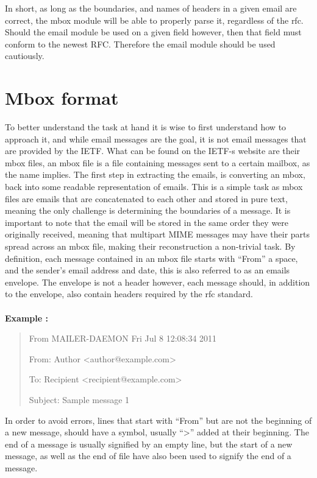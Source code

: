 \documentclass{report}
\begin{document}
In short, as long as the boundaries, and names of headers in a given email are correct, the mbox module will be able to properly parse it, regardless of the rfc.
Should the email module be used on a given field however, then that field must conform to the newest RFC. Therefore the email module should be used cautiously.


\section{Mbox format}
To better understand the task at hand it is wise to first understand how to approach it, and while  email messages are the goal, it is not email messages that are provided by the IETF. What can be found on the IETF-s website are their mbox files, an mbox file is a file containing messages sent to a certain mailbox, as the name implies. 
The first step in extracting the emails, is converting an mbox, back into some readable representation of emails. This is a simple task as mbox files are emails that are  concatenated to each other and stored in pure text, meaning the only challenge is determining the boundaries of a message. It is important to note that the email will be stored in the same order they were originally received, meaning that multipart MIME messages may have their parts spread across an mbox file, making their reconstruction a non-trivial task.
By definition, each message contained in an mbox file starts with “From” a space, and the sender's email address and date, this is also referred to as an emails envelope. The envelope is not a header however, each message should, in addition to the envelope, also contain headers required by the rfc standard.\\\\
\textbf{Example :}

\begin{quote}
From MAILER-DAEMON Fri Jul  8 12:08:34 2011

From: Author <author@example.com>

To: Recipient <recipient@example.com>

Subject: Sample message 1\\

\end{quote}

In order to avoid errors, lines that start with “From” but are not the beginning of a new message, should have a symbol, usually “>” added at their beginning.  The end of a message is usually signified by an empty line, but the start of a new message, as well as the end of file have also been used to signify the end of a message.
\end{document}
